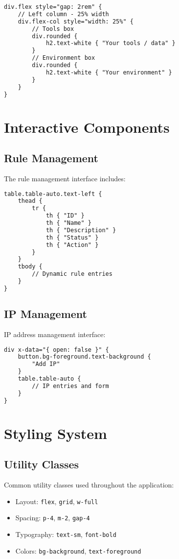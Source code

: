 \documentclass{article}
\begin{document}
\begin{lstlisting}[language=html]
div.flex style="gap: 2rem" {
    // Left column - 25% width
    div.flex-col style="width: 25%" {
        // Tools box
        div.rounded {
            h2.text-white { "Your tools / data" }
        }
        // Environment box
        div.rounded {
            h2.text-white { "Your environment" }
        }
    }
}
\end{lstlisting}

\section{Interactive Components}

\subsection{Rule Management}
The rule management interface includes:

\begin{lstlisting}[language=html]
table.table-auto.text-left {
    thead {
        tr {
            th { "ID" }
            th { "Name" }
            th { "Description" }
            th { "Status" }
            th { "Action" }
        }
    }
    tbody {
        // Dynamic rule entries
    }
}
\end{lstlisting}

\subsection{IP Management}
IP address management interface:

\begin{lstlisting}[language=html]
div x-data="{ open: false }" {
    button.bg-foreground.text-background {
        "Add IP"
    }
    table.table-auto {
        // IP entries and form
    }
}
\end{lstlisting}

\section{Styling System}

\subsection{Utility Classes}
Common utility classes used throughout the application:

\begin{itemize}
    \item Layout: \texttt{flex}, \texttt{grid}, \texttt{w-full}
    \item Spacing: \texttt{p-4}, \texttt{m-2}, \texttt{gap-4}
    \item Typography: \texttt{text-sm}, \texttt{font-bold}
    \item Colors: \texttt{bg-background}, \texttt{text-foreground}
\end{itemize}
\end{document}
